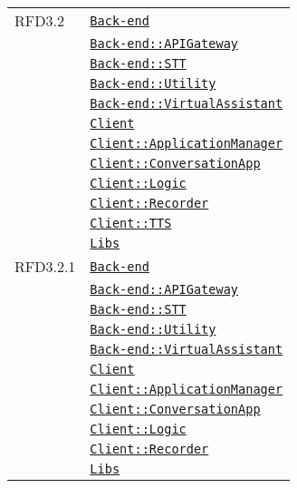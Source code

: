 \begin{longtable}{|>{\centering}m{3cm}|m{10cm}<{\centering}|}
RFD3.2 & \hyperref[Back-end]{\texttt{Back-end}}\\
& \hyperref[Back-end::APIGateway]{\texttt{Back-end::APIGateway}}\\
& \hyperref[Back-end::STT]{\texttt{Back-end::STT}}\\
& \hyperref[Back-end::Utility]{\texttt{Back-end::Utility}}\\
& \hyperref[Back-end::VirtualAssistant]{\texttt{Back-end::VirtualAssistant}}\\
& \hyperref[Client]{\texttt{Client}}\\
& \hyperref[Client::ApplicationManager]{\texttt{Client::ApplicationManager}}\\
& \hyperref[Client::ConversationApp]{\texttt{Client::ConversationApp}}\\
& \hyperref[Client::Logic]{\texttt{Client::Logic}}\\
& \hyperref[Client::Recorder]{\texttt{Client::Recorder}}\\
& \hyperref[Client::TTS]{\texttt{Client::TTS}}\\
& \hyperref[Libs]{\texttt{Libs}}\\ \hline

RFD3.2.1 & \hyperref[Back-end]{\texttt{Back-end}}\\
& \hyperref[Back-end::APIGateway]{\texttt{Back-end::APIGateway}}\\
& \hyperref[Back-end::STT]{\texttt{Back-end::STT}}\\
& \hyperref[Back-end::Utility]{\texttt{Back-end::Utility}}\\
& \hyperref[Back-end::VirtualAssistant]{\texttt{Back-end::VirtualAssistant}}\\
& \hyperref[Client]{\texttt{Client}}\\
& \hyperref[Client::ApplicationManager]{\texttt{Client::ApplicationManager}}\\
& \hyperref[Client::ConversationApp]{\texttt{Client::ConversationApp}}\\
& \hyperref[Client::Logic]{\texttt{Client::Logic}}\\
& \hyperref[Client::Recorder]{\texttt{Client::Recorder}}\\
& \hyperref[Libs]{\texttt{Libs}}\\ \hline


\end{longtable}
